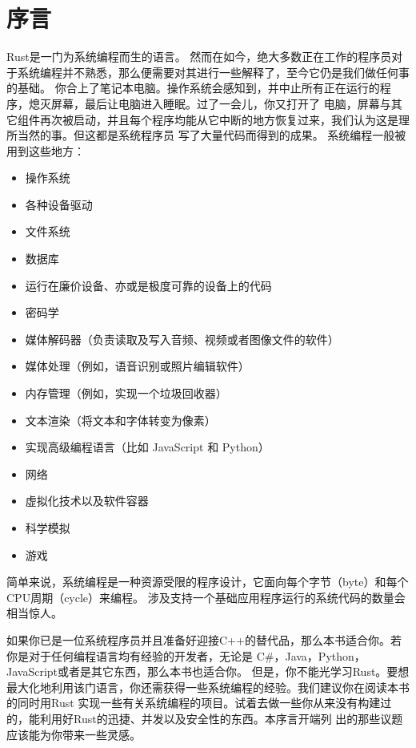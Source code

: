 
\frontmatter
\chapter{序言}

Rust是一门为系统编程而生的语言。
然而在如今，绝大多数正在工作的程序员对于系统编程并不熟悉，那么便需要对其进行一些解释了，至今它仍是我们做任何事的基础。
你合上了笔记本电脑。操作系统会感知到，并中止所有正在运行的程序，熄灭屏幕，最后让电脑进入睡眠。过了一会儿，你又打开了
电脑，屏幕与其它组件再次被启动，并且每个程序均能从它中断的地方恢复过来，我们认为这是理所当然的事。但这都是系统程序员
写了大量代码而得到的成果。
系统编程一般被用到这些地方：
\begin{itemize}
    \item 操作系统
    \item 各种设备驱动
    \item 文件系统
    \item 数据库
    \item 运行在廉价设备、亦或是极度可靠的设备上的代码
    \item 密码学
    \item 媒体解码器（负责读取及写入音频、视频或者图像文件的软件）
    \item 媒体处理（例如，语音识别或照片编辑软件）
    \item 内存管理（例如，实现一个垃圾回收器）
    \item 文本渲染（将文本和字体转变为像素）
    \item 实现高级编程语言（比如 JavaScript 和 Python）
    \item 网络
    \item 虚拟化技术以及软件容器
    \item 科学模拟
    \item 游戏
\end{itemize}
简单来说，系统编程是一种资源受限的程序设计，它面向每个字节（byte）和每个CPU周期（cycle）来编程。
涉及支持一个基础应用程序运行的系统代码的数量会相当惊人。


如果你已是一位系统程序员并且准备好迎接C++的替代品，那么本书适合你。若你是对于任何编程语言均有经验的开发者，无论是
C\#，Java，Python，JavaScript或者是其它东西，那么本书也适合你。
但是，你不能光学习Rust。要想最大化地利用该门语言，你还需获得一些系统编程的经验。我们建议你在阅读本书的同时用Rust
实现一些有关系统编程的项目。试着去做一些你从来没有构建过的，能利用好Rust的迅捷、并发以及安全性的东西。本序言开端列
出的那些议题应该能为你带来一些灵感。


